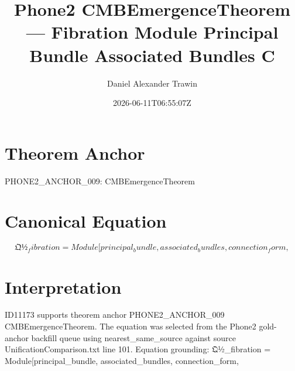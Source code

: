 \documentclass[11pt]{article}
\title{Phone2 CMBEmergenceTheorem — Fibration Module Principal Bundle Associated Bundles C}
\author{Daniel Alexander Trawin}
\date{2026-06-11T06:55:07Z}
\begin{document}
\maketitle
\section*{Theorem Anchor}
PHONE2_ANCHOR_009: CMBEmergenceTheorem
\section*{Canonical Equation}
\[
𝔔½_fibration = Module[{principal_bundle, associated_bundles, connection_form},
\]
\section*{Interpretation}
ID11173 supports theorem anchor PHONE2_ANCHOR_009 CMBEmergenceTheorem. The equation was selected from the Phone2 gold-anchor backfill queue using nearest_same_source against source UnificationComparison.txt line 101. Equation grounding: 𝔔½_fibration = Module[{principal_bundle, associated_bundles, connection_form},
\end{document}
